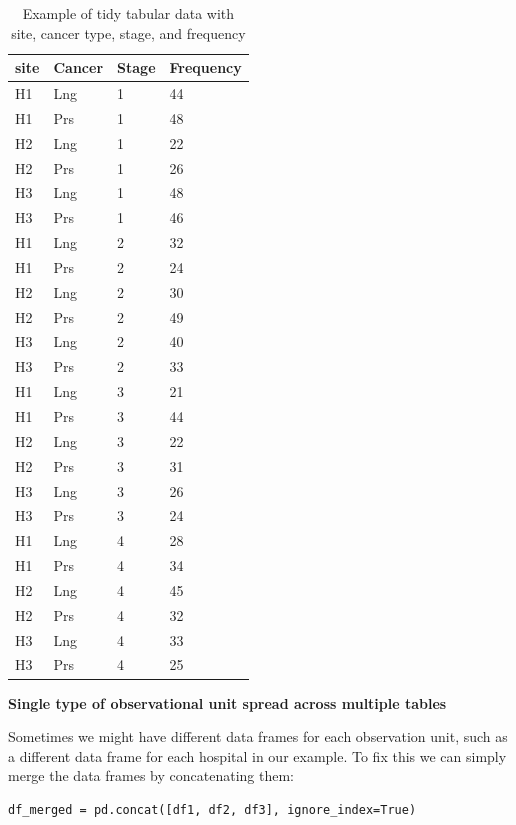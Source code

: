 \bigskip\noindent
\begin{table}[!htbp]
\centering
\begin{tabular}{p{}p{}p{}p{}}
\toprule
site & Cancer & Stage & Frequency \\
\hline
H1 & Lng & 1 & 44 \\
H1 & Prs & 1 & 48 \\
H2 & Lng & 1 & 22 \\
H2 & Prs & 1 & 26 \\
H3 & Lng & 1 & 48 \\
H3 & Prs & 1 & 46 \\
H1 & Lng & 2 & 32 \\
H1 & Prs & 2 & 24 \\
H2 & Lng & 2 & 30 \\
H2 & Prs & 2 & 49 \\
H3 & Lng & 2 & 40 \\
H3 & Prs & 2 & 33 \\
H1 & Lng & 3 & 21 \\
H1 & Prs & 3 & 44 \\
H2 & Lng & 3 & 22 \\
H2 & Prs & 3 & 31 \\
H3 & Lng & 3 & 26 \\
H3 & Prs & 3 & 24 \\
H1 & Lng & 4 & 28 \\
H1 & Prs & 4 & 34 \\
H2 & Lng & 4 & 45 \\
H2 & Prs & 4 & 32 \\
H3 & Lng & 4 & 33 \\
H3 & Prs & 4 & 25 \\
\bottomrule
\end{tabular}
\caption{Example of tidy tabular data with site, cancer type, stage, and frequency}
\label{tidy-both-table}
\end{table}

\bigskip

\textbf{Single type of observational unit spread across multiple tables}

Sometimes we might have different data frames for each observation unit, such as a different data frame for each hospital in our example. To fix this we can simply merge the data frames by concatenating them:

\begin{lstlisting}[style=Pythonshort]
df_merged = pd.concat([df1, df2, df3], ignore_index=True)
\end{lstlisting}

